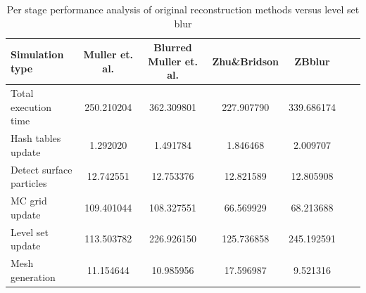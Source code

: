\begin{table}[h]
	\begin{center}
		\scriptsize
		\begin{tabular}{|l|c|c|c|c|c|c|}
			\hline
			Simulation type & Muller et. al. & Blurred Muller et. al. & Zhu\&Bridson & ZBblur \\
			\hline
			Total execution time		&	250.210204	&	362.309801	&	227.907790	&	339.686174	\\
			Hash tables update			&	1.292020	&	1.491784	&	1.846468	&	2.009707	\\
			Detect surface particles	&	12.742551	&	12.753376	&	12.821589	&	12.805908	\\
			MC grid update				&	109.401044	&	108.327551	&	66.569929	&	68.213688	\\
			Level set update			&	113.503782	&	226.926150	&	125.736858	&	245.192591	\\
			Mesh generation				&	11.154644	&	10.985956	&	17.596987	&	9.521316	\\
			\hline
		\end{tabular}
	\end{center}
	\caption{Per stage performance analysis of original reconstruction methods versus level set blur}
	\label{tab:perf_analysis}
\end{table}

